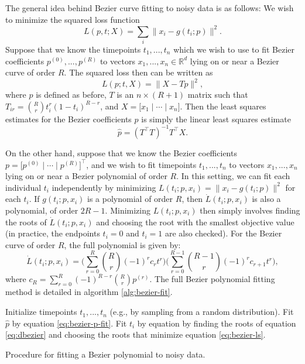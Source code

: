\documentclass[
  12pt,
]{article}
\theoremstyle{definition}
\theoremstyle{definition}
\theoremstyle{definition}
\theoremstyle{definition}
\theoremstyle{remark}
\begin{document}
The general idea behind Bezier curve fitting to noisy data is as follows:
We wish to minimize the squared loss function
\begin{equation}
\label{eq:bezier-ls}
L(p, t; X) = \sum_i \|x_i - g(t_i; p)\|^2.
\end{equation}
Suppose that we know the timepoints \(t_1, ..., t_n\) which we wish to use to fit Bezier coefficients \(p^{(0)}, ..., p^{(R)}\) to vectors \(x_1, ..., x_n \in \mathbb{R}^d\) lying on or near a Bezier curve of order \(R\).
The squared loss then can be written as
\[L(p; t, X) = \|X - T p\|^2,\]
where \(p\) is defined as before, \(T\) is an \(n \times (R+1)\) matrix such that \(T_{ir} = \binom{R}{r} t_i^r (1-t_i)^{R-r}\), and \(X = \Big[ x_1 \mid \cdots \mid x_n \Big]\).
Then the least squares estimates for the Bezier coefficients \(p\) is simply the linear least squares estimate
\begin{equation}
\label{eq:bezier-p-fit}
\hat{p} = (T^\top T)^{-1} T^\top X.
\end{equation}

On the other hand, suppose that we know the Bezier coefficients \(p = \Big[ p^{(0)} \mid \cdots \mid p^{(R)} \Big]^\top\), and we wish to fit timepoints \(t_1, ..., t_n\) to vectors \(x_1, ..., x_n\) lying on or near a Bezier polynomial of order \(R\).
In this setting, we can fit each individual \(t_i\) independently by minimizing \(L(t_i; p, x_i) = \|x_i - g(t_i; p)\|^2\) for each \(t_i\).
If \(g(t_i; p, x_i)\) is a polynomial of order \(R\), then \(\dot{L}(t_i; p, x_i)\) is also a polynomial, of order \(2 R - 1\).
Minimizing \(L(t_i; p, x_i)\) then simply involves finding the roots of \(\dot{L}(t_i; p, x_i)\) and choosing the root with the smallest objective value (in practice, the endpoints \(t_i = 0\) and \(t_i = 1\) are also checked).
For the Bezier curve of order \(R\), the full polynomial is given by:
\begin{equation}
\label{eq:dbezier}
\dot{L}(t_i; p, x_i) = \bigg(\sum_{r=0}^R \binom{R}{r} (-1)^r c_r t^r \bigg) \bigg(\sum_{r=0}^{R-1} \binom{R-1}{r} (-1)^r c_{r+1} t^r \bigg),
\end{equation}
where \(c_R = \sum_{r=0}^R (-1)^{R-r} \binom{R}{r} p^{(r)}\).
The full Bezier polynomial fitting method is detailed in algorithm \ref{alg:bezier-fit}.

\begin{algorithm}[h]
\label{alg:bezier-fit}
\DontPrintSemicolon
\SetAlgoLined
{}
Initialize timepoints $t_1, ..., t_n$ (e.g., by sampling from a random distribution).\;
 {
  Fit $\hat{p}$ by equation \ref{eq:bezier-p-fit}.\;
   {
    Fit $t_i$ by equation by finding the roots of equation \ref{eq:dbezier} and choosing the roots that minimize equation \ref{eq:bezier-ls}.\;
  }
}
\caption{Procedure for fitting a Bezier polynomial to noisy data.}
\end{algorithm}
\end{document}
